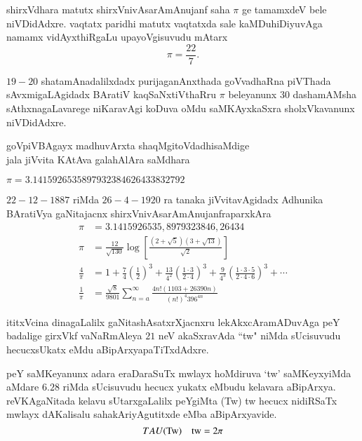 shirxVdhara matutx shirxVnivAsarAmAnujanf saha $\pi$ ge tamamxdeV bele niVDidAdxre. vaqtatx paridhi matutx vaqtatxda sale kaMDuhiDiyuvAga namamx vidAyxthiRgaLu upayoVgisuvudu mAtarx
$$
\pi = \frac{22}{7}.
$$

$19-20$ shatamAnadalilxdadx purijaganAnxthada goVvadhaRna piVThada sAvxmigaLAgidadx BAratiV kaqSaNxtiVthaRru $\pi$ beleyanunx $30$ dashamAMsha sAthxnagaLavarege niKaravAgi koDuva oMdu saMKAyxkaSxra sholxVkavanunx niVDidAdxre. 
\begin{center}
goVpiVBAgayx madhuvArxta shaqMgitoVdadhisaMdige\\
jala jiVvita KAtAva galahAlAra saMdhara
\end{center}

$\pi = 3.1415926535897932384626433832792$

\vfill\eject
$22-12-1887$ riMda $26-4-1920$ ra tanaka jiVvitavAgidadx Adhunika BAratiVya gaNitajacnx             \;shirxVnivAsarAmAnujanfraparxkAra
\begin{align*}
\pi &= 3.1415926535,8979323846,26434\\
\pi &= \frac{12}{\sqrt{130}}\log\left[\frac{{(2+\sqrt{5})}{(3+\sqrt{13})}}{\sqrt{2}}\right]\\
\frac{4}{\pi} &= 1 + \frac{7}{4}\left(\frac{1}{2}\right)^3 + \frac{13}{4^{2}}\left(\frac{1 \cdot 3}{2 \cdot 4}\right)^3 + \frac{9}{4^{3}}\left(\frac{1 \cdot 3 \cdot 5}{2 \cdot 4 \cdot 6}\right)^3 +\cdots\\
\frac{1}{\pi} &= \frac{\sqrt{8}}{9801} \sum_{n=a}^\infty \frac{4n!(1103+26390n)}{(n!)^{4}396^{4n}}
\end{align*}

ititxVcina dinagaLalilx gaNitashAsatxrXjacnxru lekAkxcAramADuvAga peY badalige girxVkf  vaNaRmAleya $21$ neV akaSxravAda ``tw" niMda sUcisuvudu hecucxsUkatx eMdu aBipArxyapaTiTxdAdxre.

peY saMKeyanunx adara eraDaraSuTx mwlayx hoMdiruva `tw' saMKeyxyiMda aMdare $6.28$ riMda sUcisuvudu hecucx yukatx eMbudu kelavara aBipArxya. reVKAgaNitada kelavu sUtarxgaLalilx peYgiMta (Tw) tw hecucx nidiRSaTx mwlayx dAKalisalu sahakAriyAgutitxde eMba aBipArxyavide.
$$
TAU\text{(Tw)\quad tw} = 2\pi
$$
